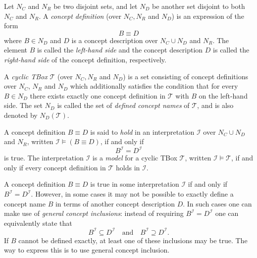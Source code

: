 \begin{Definition}
  \label{def:concept-definitions-cyclic-TBoxes}
  Let $N_C$ and $N_R$ be two disjoint sets, and let $N_D$ be another set disjoint to both
  $N_C$ and $N_R$.  A \emph{concept definition} (over $N_C, N_R$ and $N_D$) is an
  expression of the form
  \begin{equation*}
    B \equiv D
  \end{equation*}
  where $B \in N_D$ and $D$ is a concept description over $N_C \cup N_D$ and $N_R$.  The
  element $B$ is called the \emph{left-hand side} and the concept description $D$ is
  called the \emph{right-hand side} of the concept definition, respectively.

  A \emph{cyclic TBox} $\mathcal{T}$ (over $N_C, N_R$ and $N_D$) is a set consisting of
  concept definitions over $N_C$, $N_R$ and $N_D$ which additionally satisfies the
  condition that for every $B \in N_D$ there exists exactly one concept definition in
  $\mathcal{T}$ with $B$ on the left-hand side.  The set $N_D$ is called the set of
  \emph{defined concept names} of $\mathcal{T}$, and is also denoted by
  $N_D(\mathcal{T})$.

  A concept definition $B \equiv D$ is said to \emph{hold} in an interpretation
  $\mathcal{I}$ over $N_C \cup N_D$ and $N_R$, written $\mathcal{I} \models (B \equiv D)$,
  if and only if
  \begin{equation*}
    B^{\mathcal{I}} = D^{\mathcal{I}}
  \end{equation*}
  is true.  The interpretation $\mathcal{I}$ is a \emph{model} for a cyclic TBox
  $\mathcal{T}$, written $\mathcal{I} \models \mathcal{T}$, if and only if every concept
  definition in $\mathcal{T}$ holds in $\mathcal{I}$.
\end{Definition}

A concept definition $B \equiv D$ is true in some interpretation $\mathcal{I}$ if and only
if $B^{\mathcal{I}} = D^{\mathcal{I}}$.  However, in some cases it may not be possible to
exactly define a concept name $B$ in terms of another concept description $D$.  In such
cases one can make use of \emph{general concept inclusions}: instead of requiring
$B^{\mathcal{I}} = D^{\mathcal{I}}$ one can equivalently state that
\begin{equation*}
  B^{\mathcal{I}} \subseteq D^{\mathcal{I}} \quad\text{and}\quad B^{\mathcal{I}} \supseteq D^{\mathcal{I}}.
\end{equation*}
If $B$ cannot be defined exactly, at least one of these inclusions may be true.  The way
to express this is to use general concept inclusion.

